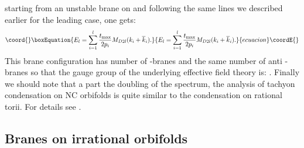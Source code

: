 \documentclass[a4paper,12pt]{article}
\begin{document}
starting from an unstable \coordHE{} brane on \coordHE{} and following the same lines we described earlier for the leading \coordHE{} case, one gets:
\begin{equation}\coord{}\boxEquation{
E_{l}=\sum_{i=1}^{l}\frac{t_{\text{max}}}{2p_{i}}M_{D2l}(k_{i}+\overline{k}
_{i}).
}{
E_{l}=\sum_{i=1}^{l}\frac{t_{\text{max}}}{2p_{i}}M_{D2l}(k_{i}+\overline{k}
_{i}).
}{ecuacion}\coordE{}\end{equation}
This brane configuration has \coordHE{} number of \coordHE{}-branes and
the same number of anti \coordHE{}-branes so that the gauge group of the
underlying effective field theory is: \coordHE{}. Finally we should note that a part the doubling of
the spectrum, the analysis of tachyon condensation on NC
orbifolds is quite similar to the condensation on rational torii. For
details see \cite{j}.

\subsection{ Branes on irrational orbifolds}
\end{document}
